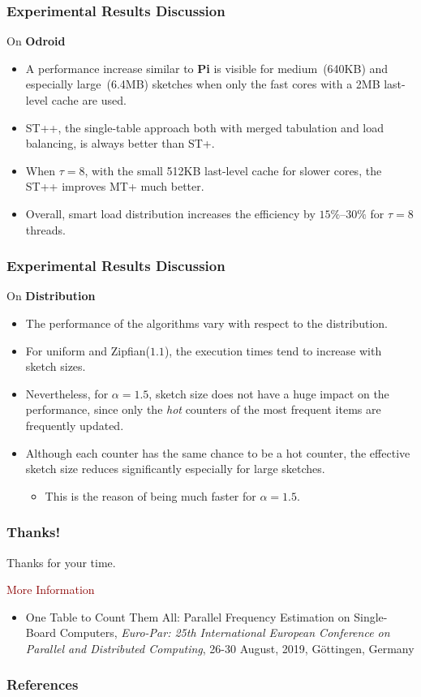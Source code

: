 \documentclass{beamer}
\begin{document}
\begin{frame}
	\frametitle{Experimental Results Discussion}
	On {\bf Odroid}
	\begin{itemize}
		\item A performance increase similar to {\bf Pi} is visible for medium~(640KB) and especially large~(6.4MB) sketches when only the fast cores with a 2MB last-level cache are used.
		\item ST++, the single-table approach both with merged tabulation and load balancing, is always better than ST+.
		\item When $\tau = 8$, with the small 512KB last-level cache for slower cores, the ST++ improves MT+ much better.
		\item Overall, smart load distribution increases the efficiency by $15\%$--$30\%$ for $\tau = 8$ threads.
	\end{itemize}
\end{frame}

\begin{frame}
	\frametitle{Experimental Results Discussion}
	On {\bf Distribution}
	\begin{itemize}
		\item The performance of the algorithms vary with respect to the distribution.
		\item For uniform and Zipfian($1.1$), the execution times tend to increase with sketch sizes.
		\item Nevertheless, for $\alpha = 1.5$, sketch size does not have a huge impact on the performance, since only the {\em hot} counters of the most frequent items are frequently updated.
		\item Although each counter has the same chance to be a hot counter, the effective sketch size reduces significantly especially for large sketches.
		\begin{itemize}
			\item This is the reason of being much faster for $\alpha = 1.5$.
		\end{itemize}
	\end{itemize}
\end{frame}



\begin{frame}[fragile]
	\frametitle{Thanks!}
	Thanks for your time.\\
	\vspace{3mm}
	
	\vspace{5mm}
	\textcolor{darkred}{More Information}
	\begin{itemize}
		\item One Table to Count Them All: Parallel Frequency Estimation on Single-Board Computers, {\it Euro-Par: 25th International European Conference on Parallel and Distributed Computing}, 26-30 August, 2019, G\"{o}ttingen, Germany  \\
	\end{itemize}
	
\end{frame}


\begin{frame}[allowframebreaks]
\frametitle{References}


\end{frame}



 
\end{document}
